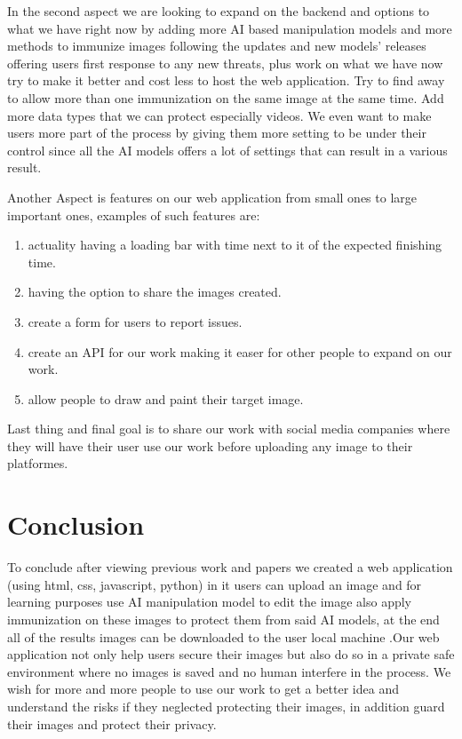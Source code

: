 \documentclass[sigconf]{acmart}
\begin{document}
In the second aspect we are looking to expand on the backend and options to what we have right now by adding more AI based manipulation models and more methods to immunize images following the updates and new models' releases offering users first response to any new threats, plus work on what we have now try to make it better and cost less to host the web application. Try to find away to allow more than one immunization on the same image at the same time. Add more data types that we can protect especially videos. We even want to make users more part of the process by giving them more setting to be under their control since all the AI models offers a lot of settings that can result in a various result.

Another Aspect is features on our web application from small ones to large important ones, examples of such features are: 

\begin{enumerate}
  \item actuality having a loading bar with time next to it of the expected finishing time.
  \item having the option to share the images created.
  \item create a form for users to report issues.
  \item create an API for our work making it easer for other people to expand on our work.
  \item allow people to draw and paint their target image.
\end{enumerate} 

 Last thing and final goal is to share our work with social media companies where they will have their user use our work before uploading any image to their platformes.  

\section{Conclusion}

To conclude after viewing previous work and papers we created a web application (using html, css, javascript, python) in it users can  upload an image and for learning purposes use AI manipulation model to edit the image also apply immunization on these images to protect them from said AI models, at the end all of the results images can be downloaded to the user local machine .Our web application not only help users secure their images but also do so in a private safe environment where no images is saved and no human interfere in the process. We wish for more and more people to use our work to get a better idea and understand the risks if they neglected protecting their images, in addition guard their images and protect their privacy.
\end{document}
